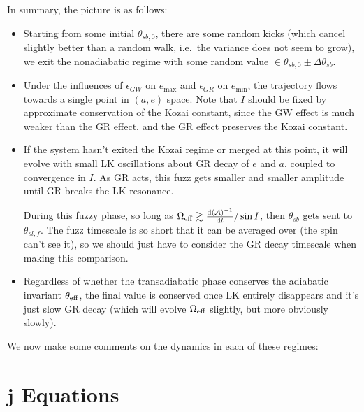 \documentclass[11pt,
        usenames, %
        dvipsnames %
    ]{article}
\newcommand*{\rd}[2]{\frac{\mathrm{d}#1}{\mathrm{d}#2}}
\newcommand*{\bm}[1]{\boldsymbol{\mathbf{#1}}}
\begin{document}
In summary, the picture is as follows:
\begin{itemize}
    \item Starting from some initial $\theta_{sb, 0}$, there are some random
        kicks (which cancel slightly better than a random walk, i.e.\ the
        variance does not seem to grow), we exit the nonadiabatic regime with
        some random value $\in \theta_{sb, 0} \pm \Delta \theta_{sb}$.

    \item Under the influences of $\epsilon_{GW}$ on $e_{\max}$ and
        $\epsilon_{GR}$ on $e_{\min}$, the trajectory flows towards a single
        point in $(a, e)$ space. Note that $I$ should be fixed by approximate
        conservation of the Kozai constant, since the GW effect is much weaker
        than the GR effect, and the GR effect preserves the Kozai constant.

    \item If the system hasn't exited the Kozai regime or merged at this point,
        it will evolve with small LK oscillations about GR decay of $e$ and $a$,
        coupled to convergence in $I$. As GR acts, this fuzz gets smaller and
        smaller amplitude until GR breaks the LK resonance.

        During this fuzzy phase, so long as $\Omega_{\rm eff} \gtrsim
        \rd{(\mathcal{A})^{-1}}{t}/\sin I$, then $\theta_{sb}$ gets sent to
        $\theta_{sl, f}$. The fuzz timescale is so short that it can be averaged
        over (the spin can't see it), so we should just have to consider the GR
        decay timescale when making this comparison.

    \item Regardless of whether the transadiabatic phase conserves the adiabatic
        invariant $\theta_{\rm eff}$, the final value is conserved once LK
        entirely disappears and it's just slow GR decay (which will evolve
        $\Omega_{\rm eff}$ slightly, but more obviously slowly).
\end{itemize}

We now make some comments on the dynamics in each of these regimes:

\appendix

\section{$\bm{j}$ Equations}
\end{document}
